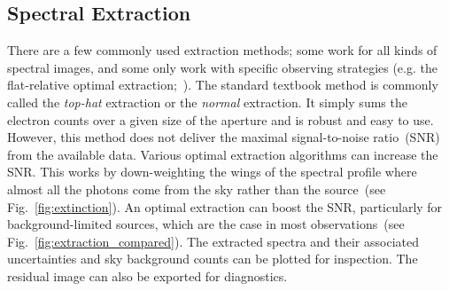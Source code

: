 \documentclass[linenumbers, twocolumn]{aastex631}
\begin{document}
\subsection{Spectral Extraction}
\label{sec:extract}
There are a few commonly used extraction methods; some work for
all kinds of spectral images, and some only work with specific
observing strategies (e.g. the flat-relative optimal
extraction;~\citealt{2014A&A...561A..59Z}). The standard textbook
method is commonly called the \textit{top-hat} extraction or the
\textit{normal} extraction. It simply sums the electron counts over
a given size of the aperture and is robust and easy to use. However,
this method does not deliver the maximal signal-to-noise ratio~(SNR)
from the available data. Various optimal extraction algorithms
can increase the SNR. This works by down-weighting the wings of the
spectral profile where almost all the photons come from the sky
rather than the source~(see Fig.~\ref{fig:extinction}). An optimal
extraction can boost the SNR, particularly for background-limited
sources, which are the case in most observations~(see
Fig.~\ref{fig:extraction_compared}). The extracted spectra and their
associated uncertainties and sky background counts can be plotted
for inspection. The residual image can also be exported for diagnostics.
\end{document}
